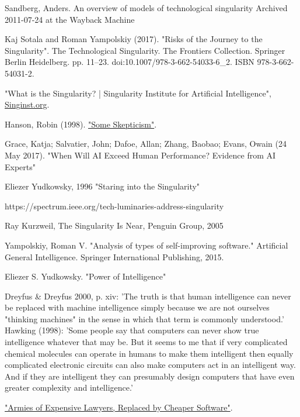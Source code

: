 \documentclass[a4paper]{article}
\begin{document}
\begin{thebibliography}{9}
 Sandberg, Anders. An overview of models of technological singularity Archived 2011-07-24 at the Wayback Machine

 Kaj Sotala and Roman Yampolskiy (2017). "Risks of the Journey to the Singularity". The Technological Singularity. The Frontiers Collection. Springer Berlin Heidelberg. pp. 11–23. doi:10.1007/978-3-662-54033-6\_2. ISBN 978-3-662-54031-2.

 "What is the Singularity? | Singularity Institute for Artificial Intelligence",  \href{https://web.archive.org/web/20110908014050/http://singinst.org/overview/whatisthesingularity/}{Singinst.org}.

 Hanson, Robin (1998). \href{https://mason.gmu.edu/~rhanson/vc.html#hanson}{"Some Skepticism"}.

 Grace, Katja; Salvatier, John; Dafoe, Allan; Zhang, Baobao; Evans, Owain (24 May 2017). "When Will AI Exceed Human Performance? Evidence from AI Experts"

 Eliezer Yudkowsky, 1996 "Staring into the Singularity"

 https://spectrum.ieee.org/tech-luminaries-address-singularity

 Ray Kurzweil, The Singularity Is Near, Penguin Group, 2005

 Yampolskiy, Roman V. "Analysis of types of self-improving software." Artificial General Intelligence. Springer International Publishing, 2015.

 Eliezer S. Yudkowsky. "Power of Intelligence"

 Dreyfus \& Dreyfus 2000, p. xiv: 'The truth is that human intelligence can never be replaced with machine intelligence simply because we are not ourselves "thinking machines" in the sense in which that term is commonly understood.' Hawking (1998): 'Some people say that computers can never show true intelligence whatever that may be. But it seems to me that if very complicated chemical molecules can operate in humans to make them intelligent then equally complicated electronic circuits can also make computers act in an intelligent way. And if they are intelligent they can presumably design computers that have even greater complexity and intelligence.'

\href{https://www.nytimes.com/2011/03/05/science/05legal.html}{"Armies of Expensive Lawyers, Replaced by Cheaper Software"}.


\end{thebibliography}
\end{document}
